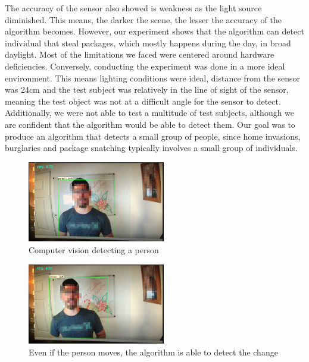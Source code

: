 The accuracy of the sensor also showed is weakness as the light source diminished. This means, the darker the scene, the lesser the accuracy of the algorithm becomes. However, our experiment shows that the algorithm can detect individual that steal packages, which mostly happens during the day, in broad daylight. Most of the limitations we faced were centered around hardware deficiencies. Conversely, conducting the experiment was done in a more ideal environment. This means lighting conditions were ideal, distance from the sensor was 24cm and the test subject was relatively in the line of sight of the sensor, meaning the test object was not at a difficult angle for the sensor to detect. Additionally, we were not able to test a multitude of test subjects, although we are confident that the algorithm would be able to detect them. Our goal was to produce an algorithm that detects a small group of people, since home invasions, burglaries and package snatching typically involves a small group of individuals.

\begin{figure}
    \centering
    \includegraphics[width=6cm]{Security Object Detection, Surveillance/Latex/figures/fig1_e.png}
    \caption{Computer vision detecting a person}
    \label{fig:fig1_e}
\end{figure}

\begin{figure}
    \centering
    \includegraphics[width=6cm]{Security Object Detection, Surveillance/Latex/figures/fig2_e.png}
    \caption{Even if the person moves, the algorithm is able to detect the change}
    \label{fig:fig2_e}
\end{figure}
